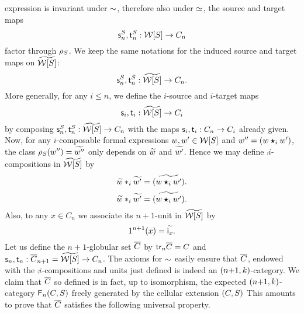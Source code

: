   expression is invariant under $\sim$, therefore also under $\simeq$, 
 the source and target maps
  \[\mathsf{s}_{n}^S,\mathsf{t}_{n}^S:\mathcal{W}[S]\to C_n\]
  factor through $\rho_{S}$. We keep the same notations for the induced
  source and target maps on $\widetilde{\mathcal{W}[S]}$:
  \[\mathsf{s}_{n}^S,\mathsf{t}_{n}^S:\widetilde{\mathcal{W}[S]}\to C_n.\]
  More generally, for any $i\leq n$, we define the $i$-source and
  $i$-target maps
  \[\mathsf{s}_{i},\mathsf{t}_{i}:\widetilde{\mathcal{W}[S]}\to C_i\]
  by composing $\mathsf{s}_{n}^S,\mathsf{t}_{n}^S:\widetilde{\mathcal{W}[S]}\to C_n$ with the maps $\mathsf{s}_{i},\mathsf{t}_{i}:C_n\to C_i$ already given. Now, for any $i$-composable formal expressions
  $w,w'\in \mathcal{W}[S]$ and $w''=(w\bm{\star}_{i} w')$, the class $\rho_{S}(w'')=\widetilde{w''}$ only
  depends on $\widetilde{w}$ and $\widetilde{w'}$. Hence we may define 
 $\comp i$-compositions in $\widetilde{\mathcal{W}[S]}$ by
 \[\widetilde{w}\ast_{i}\widetilde{w'}=\widetilde{(w\bm{\star}_{i} w')}.\]
 \[\widetilde{w}\ast_{i}\widetilde{w'}=\widetilde{(w\bm{\star}_{i} w')}.\]
 Also, to any $x\in C_n$ we associate its $n{+}1$-unit in $\widetilde{\mathcal{W}[S]}$ by
  \[1^{n+1}(x)=\widetilde{\mathsf{i}_{x}}.\]
  Let us define the $n{+}1$-globular set $\overline{C}$ by
  $\mathsf{tr}_{n}\overline{C}=C$ and $\mathsf{s}_{n},\mathsf{t}_{n}:\overline{C}_{n+1}=\widetilde{\mathcal{W}[S]}\to C_n$.
  The axioms for $\sim$ easily ensure that $\overline{C}$, endowed with
  the $\comp i$-compositions and units just defined is indeed an
  $(n{+}1,k)$-category. We claim that $\overline{C}$ so defined is
  in fact, up to isomorphism, the expected $(n{+}1,k)$-category
  $\mathsf{F}_{n}(C,S)$ freely generated by the cellular extension $(C,S)$
  This amounts to prove that $\overline{C}$ satisfies the following universal property.
  
